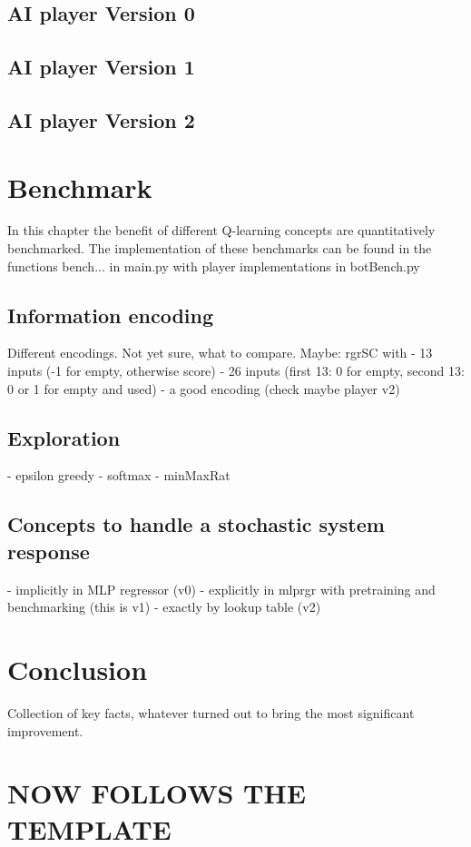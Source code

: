 \documentclass{article}
\begin{document}
\subsection{AI player Version 0}
\subsection{AI player Version 1}
\subsection{AI player Version 2}

\section{Benchmark}
In this chapter the benefit of different Q-learning concepts are quantitatively benchmarked.
The implementation of these benchmarks can be found in the functions bench... in main.py with player implementations in botBench.py
\subsection{Information encoding}
Different encodings. Not yet sure, what to compare.
Maybe: rgrSC with 
- 13 inputs (-1 for empty, otherwise score)
- 26 inputs (first 13: 0 for empty, second 13: 0 or 1 for empty and used)
- a good encoding (check maybe player v2)
\subsection{Exploration}
- epsilon greedy
- softmax
- minMaxRat
\subsection{Concepts to handle a stochastic system response}
- implicitly in MLP regressor (v0)
- explicitly in mlprgr with pretraining and benchmarking (this is v1)
- exactly by lookup table (v2)


\section{Conclusion}
Collection of key facts, whatever turned out to bring the most significant improvement.



\section{NOW FOLLOWS THE TEMPLATE}
\end{document}
